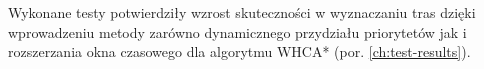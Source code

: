 Wykonane testy potwierdziły wzrost skuteczności w wyznaczaniu tras dzięki wprowadzeniu metody zarówno dynamicznego przydziału priorytetów jak i rozszerzania okna czasowego dla algorytmu WHCA* (por. \ref{ch:test-results}).


